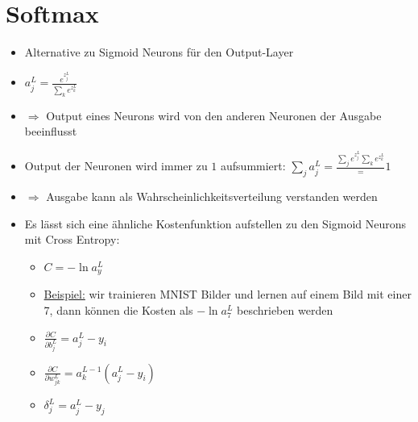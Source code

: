 \section{Softmax}

\begin{itemize}
  \item Alternative zu Sigmoid Neurons für den Output-Layer
  \item $a^L_j = \frac{e^{z_j^L}}{\sum_k e^{z_k^L}}$
  \item $\Rightarrow$ Output eines Neurons wird von den anderen Neuronen der Ausgabe beeinflusst
  \item Output der Neuronen wird immer zu $1$ aufsummiert: $\sum_j a^L_j = \frac{\sum_j e^{z_j^L}{\sum_k e^{z_k^L}}} = 1$
  \item $\Rightarrow$ Ausgabe kann als Wahrscheinlichkeitsverteilung verstanden werden
  \item Es lässt sich eine ähnliche Kostenfunktion aufstellen zu den Sigmoid Neurons mit Cross Entropy:
  \begin{itemize}
    \item $C = - \ln a^L_y$
    \item \underline{Beispiel:} wir trainieren MNIST Bilder und lernen auf einem Bild mit einer 7, dann können die Kosten als $- \ln a^L_7$ beschrieben werden
    \item $\frac{\partial C}{\partial b_j^L} = a^L_j - y_i$
    \item $\frac{\partial C}{\partial w^L_{jk}} = a^{L-1}_k (a^L_j - y_i)$
    \item $\delta^L_j = a^L_j - y_j$
  \end{itemize}
\end{itemize}
